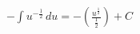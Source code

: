 \documentclass[preview]{standalone}
\begin{document}
\begin{align*}
-\int u^{-\frac{1}{2}} \, du = -\left( \frac{u^{\frac{1}{2}}}{\frac{1}{2}} \right) + C
\end{align*}
\end{document}

